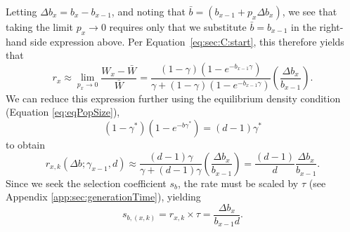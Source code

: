 \documentclass[9pt,twocolumn,twoside,lineno]{gsajnl}
\begin{document}
Letting $\Delta b_{x} = b_{x}-b_{x-1}$, and noting that $\bar{b} = (b_{x-1}+p_x \Delta b_{x})$, we see that taking the limit $p_x\rightarrow 0$ requires only that we substitute $\bar{b}=b_{x-1}$ in the right-hand side expression above. 
Per Equation~\eqref{eq:sec:C:start}, this therefore yields that %
\[
r_{x} \approx \lim_{p_{x}\rightarrow 0} \frac{W_{x}-\bar{W}}{\bar{W}} = \frac{(1-\gamma)\left(1-e^{-b_{x-1}\gamma}\right)}{\gamma+(1-\gamma)(1-e^{-b_{x-1}\gamma})}\left( \frac{\Delta b_{x}}{b_{x-1}}\right). 
\] 
We can reduce this expression further using the equilibrium density condition (Equation \eqref{eq:eqPopSize}), 
\[
(1-\gamma^*)(1-e^{-b\gamma^*}) = (d-1)\gamma^*
\]
to obtain
\[
r_{x,k}(\Delta b; \gamma_{x-1},d) \approx \frac{(d-1)\gamma}{\gamma+(d-1)\gamma}\left( \frac{\Delta b_{x}}{b_{x-1}}\right) = \frac{(d-1)}{d}\frac{\Delta b_x}{b_{x-1}}.
\]
Since we seek the selection coefficient $s_b$, the rate must be scaled by $\tau$ (see Appendix \ref{app:sec:generationTime}), yielding
\begin{equation}
\label{eqtn:bTermSelectionCoeff}
s_{b,(x,k)}= r_{x,k} \times \tau = \frac{\Delta b_{x} }{b_{x-1}d}.
\end{equation}\\
\end{document}
